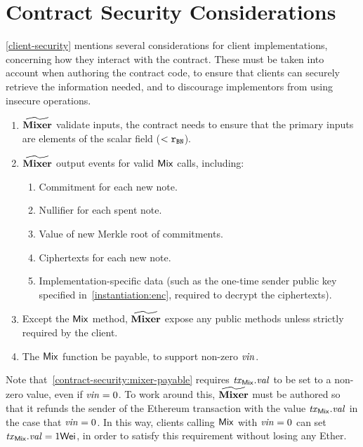 
\section{Contract Security Considerations}\label{contract-security}

\cref{client-security} mentions several considerations for client implementations, concerning how they interact with the contract.  These must be taken into account when authoring the contract code, to ensure that clients can securely retrieve the information needed, and to discourage implementors from using insecure operations.

\begin{enumerate}
  \item $\widetilde{\mathbf{Mixer}}$ \MUST{} validate inputs, the contract needs to ensure that the primary inputs are elements of the scalar field \FFx{\rBN} ($< \mathtt{r_{BN}}$).
  \item $\widetilde{\mathbf{Mixer}}$ \MUST{} output events for valid $\mathsf{Mix}$ calls, including:
      \begin{enumerate}
        \item Commitment for each new note.
        \item Nullifier for each spent note.
        \item Value of new Merkle root of commitments.
        \item Ciphertexts for each new note.
        \item Implementation-specific data (such as the one-time sender public key specified in~\cref{instantiation:enc}, required to decrypt the ciphertexts).
      \end{enumerate}
  \item Except the $\mathsf{Mix}$ method, $\widetilde{\mathbf{Mixer}}$ \SHOULDNOT{} expose any public methods unless strictly required by the client.
  \item\label{contract-security:mixer-payable} The $\mathsf{Mix}$ function \MUST{} be payable, to support non-zero $\mathit{vin}$.
\end{enumerate}

Note that~\cref{contract-security:mixer-payable} requires $\mathit{\mathit{tx}_{\mathsf{Mix}}}.\mathit{val}$ to be set to a non-zero value, even if $\mathit{vin} = 0$. To work around this, $\widetilde{\mathbf{Mixer}}$ must be authored so that it refunds the sender of the Ethereum transaction with the value $\mathit{\mathit{tx}_{\mathsf{Mix}}}.\mathit{val}$ in the case that $\mathit{vin} = 0$. In this way, clients calling $\mathsf{Mix}$ with $\mathit{vin} = 0$ can set $\mathit{\mathit{tx}_{\mathsf{Mix}}}.\mathit{val} = 1 \mathsf{Wei}$, in order to satisfy this requirement without losing any Ether.
